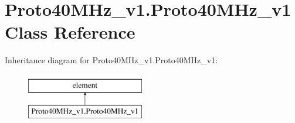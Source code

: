 \hypertarget{classProto40MHz__v1_1_1Proto40MHz__v1}{}\section{Proto40\+M\+Hz\+\_\+v1.\+Proto40\+M\+Hz\+\_\+v1 Class Reference}
\label{classProto40MHz__v1_1_1Proto40MHz__v1}
Inheritance diagram for Proto40\+M\+Hz\+\_\+v1.\+Proto40\+M\+Hz\+\_\+v1\+:\begin{figure}[H]
\begin{center}
\leavevmode
\includegraphics[height=2.000000cm]{classProto40MHz__v1_1_1Proto40MHz__v1}
\end{center}
\end{figure}
